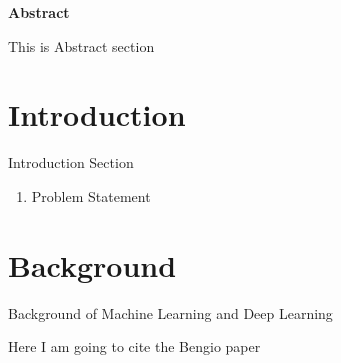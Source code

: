 \documentclass[12pt]{article}
\begin{document}
\maketitle

\begin{center}
\textbf{Abstract}
\end{center}
\noindent
This is Abstract section


\section{Introduction}
Introduction Section
\begin{enumerate}
\item Problem Statement
\end{enumerate}


\section{Background}
Background of Machine Learning and Deep Learning

Here I am going to cite the Bengio paper \cite{bengio2009learning}
\end{document}
